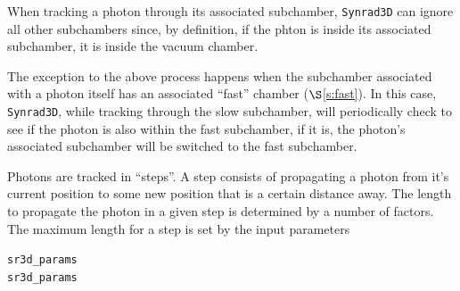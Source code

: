 \documentclass[11pt,openany]{report}
\newcommand{\sref}[1]{$\S$\ref{#1}}
\newcommand{\srthree}{\texttt{Synrad3D}\xspace}
\newlength{\ExBeg}
\newlength{\ExEnd}
\newenvironment{example}
  {\vspace{\ExBeg} \begin{alltt}}
  {\end{alltt} \vspace{\ExEnd}}
\begin{document}
When tracking a photon through its associated subchamber, \srthree can ignore all other
subchambers since, by definition, if the phton is inside its associated subchamber, it
is inside the vacuum chamber.

The exception to the above process happens when the subchamber associated with a photon
itself has an associated ``fast'' chamber (\sref{s:fast}). In this case, \srthree, while
tracking through the slow subchamber, will periodically check to see if the photon is also
within the fast subchamber, if it is, the photon's associated subchamber will be switched
to the fast subchamber.

Photons are tracked in ``steps''. A step consists of propagating a photon from it's
current position to some new position that is a certain distance away. The length to
propagate the photon in a given step is determined by a number of factors. The maximum
length for a step is set by the input parameters
\begin{example}
  sr3d_params%
  sr3d_params%
\end{example}
\end{document}
